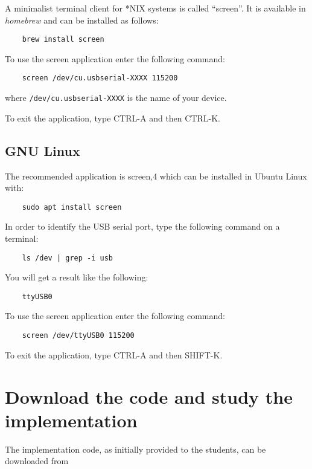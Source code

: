 A minimalist terminal client for *NIX systems is called ``screen''. It is available in \textit{homebrew} and can be installed as follows:

\begin{BVerbatim}
	brew install screen
\end{BVerbatim}


To use the screen application enter the following command:

\begin{BVerbatim}
	screen /dev/cu.usbserial-XXXX 115200
\end{BVerbatim}
	
where \texttt{/dev/cu.usbserial-XXXX} is the name of your device.

To exit the application, type CTRL-A and then CTRL-K.

\subsection{GNU Linux}

The recommended application is screen,4 which can be installed in Ubuntu Linux with:

\begin{BVerbatim}
	sudo apt install screen
\end{BVerbatim}

In order to identify the USB serial port, type the following command on a terminal:

\begin{BVerbatim}
	ls /dev | grep -i usb
\end{BVerbatim}

You will get a result like the following:

\begin{BVerbatim}
	ttyUSB0
\end{BVerbatim}

To use the screen application enter the following command:

\begin{BVerbatim}
	screen /dev/ttyUSB0 115200
\end{BVerbatim}

To exit the application, type CTRL-A and then SHIFT-K.

\section{Download the code and study the implementation}

The implementation code, as initially provided to the students, can be downloaded from

